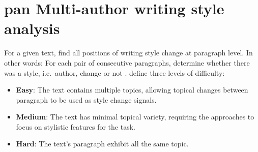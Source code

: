 \section{\acs{pan} Multi-author writing style analysis}
\label{sec:pan_multi_author_writing_style_analysis}

For a given text, find all positions of writing style change at paragraph level.
In other words: For each pair of consecutive paragraphs, 
determine whether there was a style, i.e.\ author, change or not \citep{zangerle_overview_2024,ayele_overview_2024}.
\citet{zangerle_overview_2024} define three levels of difficulty:
\begin{itemize}
    \item \textbf{Easy}: The text contains multiple topics, 
    allowing topical changes between paragraph to be used as style change signals.
    \item \textbf{Medium}: The text has minimal topical variety, 
    requiring the approaches to focus on stylistic features for the task.
    \item \textbf{Hard}: The text's paragraph exhibit all the same topic.
\end{itemize}